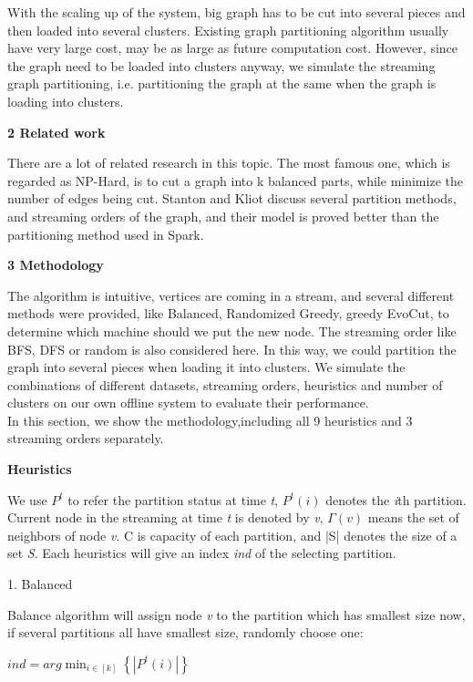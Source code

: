 \documentclass[12pt]{article}
\begin{document}
With the scaling up of the system, big graph has to be cut into several pieces and then loaded into several clusters. Existing graph partitioning algorithm usually have very large cost, may be as large as future computation cost. However, since the graph need to be loaded into clusters anyway, we simulate the streaming graph partitioning, i.e. partitioning the graph at the same when the graph is loading into clusters.

\textbf{2 Related work}

There are a lot of related research in this topic. The most famous one, which is regarded as NP-Hard, is to cut a graph into k balanced parts, while minimize the number of edges being cut. Stanton and Kliot discuss several partition methods, and streaming orders of the graph, and their model is proved better than the partitioning method used in Spark.

\textbf{3 Methodology}

The algorithm is intuitive, vertices are coming in a stream, and several different methods were provided, like Balanced, Randomized Greedy, greedy EvoCut, to determine which machine should we put the new node. The streaming order like BFS, DFS or random is also considered here. In this way, we could partition the graph into several pieces when loading it into clusters. We simulate the combinations of different datasets, streaming orders, heuristics and number of clusters on our own offline system to evaluate their performance.\\
In this section, we show the methodology,including all 9 heuristics and 3 streaming orders separately.

\textbf{Heuristics}

We use $P^{t}$ to refer the partition status at time \emph{t}, $P^{t}(i)$ denotes the \emph{i}th partition. Current node in the streaming at time \emph{t} is denoted by \emph{v}, $\Gamma (v)$ means the set of neighbors of node \emph{v}. C is capacity of each partition, and |S| denotes the size of a set \emph{S}. Each heuristics will give an index \emph{ind} of the selecting partition.

1. Balanced

Balance algorithm will assign node \emph{v} to the partition which has smallest size now, if several partitions all have smallest size, randomly choose one:
\begin {center}
$ind = arg \min_{i\in \left [ k \right ]}\left \{ \left | P^{t}(i) \right | \right \}$
\end{center}
\end{document}
